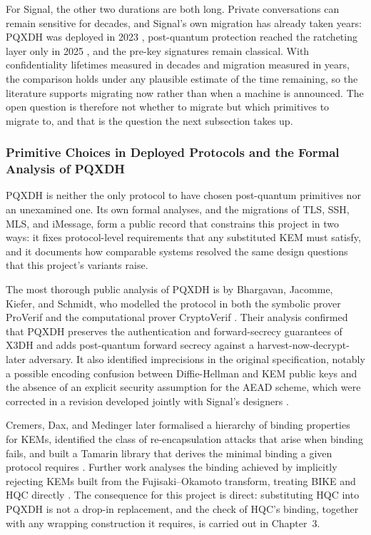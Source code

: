 For Signal, the other two durations are both long. Private conversations can remain sensitive for decades, and Signal's own migration has already taken years: PQXDH was deployed in 2023 \cite{kret_quantum_nodate}, post-quantum protection reached the ratcheting layer only in 2025 \cite{connell_signal_nodate}, and the pre-key signatures remain classical. With confidentiality lifetimes measured in decades and migration measured in years, the comparison holds under any plausible estimate of the time remaining, so the literature supports migrating now rather than when a machine is announced. The open question is therefore not whether to migrate but which primitives to migrate to, and that is the question the next subsection takes up.

\subsubsection{Primitive Choices in Deployed Protocols and the Formal Analysis of PQXDH}
\label{subsubsec:lit-protocols}

PQXDH is neither the only protocol to have chosen post-quantum primitives nor an unexamined one. Its own formal analyses, and the migrations of TLS, SSH, MLS, and iMessage, form a public record that constrains this project in two ways: it fixes protocol-level requirements that any substituted KEM must satisfy, and it documents how comparable systems resolved the same design questions that this project's variants raise.

The most thorough public analysis of PQXDH is by Bhargavan, Jacomme, Kiefer, and Schmidt, who modelled the protocol in both the symbolic prover ProVerif and the computational prover CryptoVerif \cite{bhargavan_formal_2024}. Their analysis confirmed that PQXDH preserves the authentication and forward-secrecy guarantees of X3DH and adds post-quantum forward secrecy against a harvest-now-decrypt-later adversary. It also identified imprecisions in the original specification, notably a possible encoding confusion between Diffie-Hellman and KEM public keys and the absence of an explicit security assumption for the AEAD scheme, which were corrected in a revision developed jointly with Signal's designers \cite{bhargavan_analysis_nodate}.

Cremers, Dax, and Medinger later formalised a hierarchy of binding properties for KEMs, identified the class of re-encapsulation attacks that arise when binding fails, and built a Tamarin library that derives the minimal binding a given protocol requires \cite{cremers_keeping_2023}. Further work analyses the binding achieved by implicitly rejecting KEMs built from the Fujisaki--Okamoto transform, treating BIKE and HQC directly \cite{noauthor_binding_nodate}. The consequence for this project is direct: substituting HQC into PQXDH is not a drop-in replacement, and the check of HQC's binding, together with any wrapping construction it requires, is carried out in Chapter~3.

